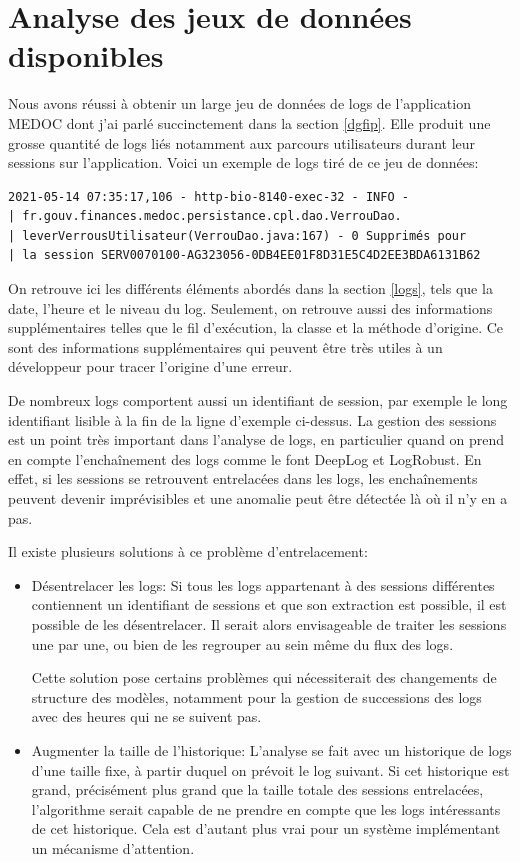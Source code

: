 \documentclass[openany, 11pt]{memoir}
\begin{document}
\newpage
\section{Analyse des jeux de données disponibles}

Nous avons réussi à obtenir un large jeu de données de \glspl{log} de l'application \gls{MEDOC} dont j'ai parlé succinctement dans la section \ref{dgfip}. Elle produit une grosse quantité de logs liés notamment aux parcours utilisateurs durant leur sessions sur l'application. Voici un exemple de logs tiré de ce jeu de données:

\begin{lstlisting}
2021-05-14 07:35:17,106 - http-bio-8140-exec-32 - INFO -
| fr.gouv.finances.medoc.persistance.cpl.dao.VerrouDao.
| leverVerrousUtilisateur(VerrouDao.java:167) - 0 Supprimés pour
| la session SERV0070100-AG323056-0DB4EE01F8D31E5C4D2EE3BDA6131B62
\end{lstlisting}

On retrouve ici les différents éléments abordés dans la section \ref{logs}, tels que la date, l'heure et le niveau du \gls{log}. Seulement, on retrouve aussi des informations supplémentaires telles que le fil d'exécution, la classe et la méthode d'origine. Ce sont des informations supplémentaires qui peuvent être très utiles à un développeur pour tracer l'origine d'une erreur.

\bigskip
De nombreux \glspl{log} comportent aussi un identifiant de session, par exemple le long identifiant lisible à la fin de la ligne d'exemple ci-dessus. La gestion des sessions est un point très important dans l'analyse de logs, en particulier quand on prend en compte l'enchaînement des logs comme le font DeepLog et LogRobust. En effet, si les sessions se retrouvent entrelacées dans les logs, les enchaînements peuvent devenir imprévisibles et une anomalie peut être détectée là où il n'y en a pas.

Il existe plusieurs solutions à ce problème d'entrelacement:
\begin{itemize}
	\item Désentrelacer les \glspl{log}: Si tous les logs appartenant à des sessions différentes contiennent un identifiant de sessions et que son extraction est possible, il est possible de les désentrelacer. Il serait alors envisageable de traiter les sessions une par une, ou bien de les regrouper au sein même du flux des logs.

Cette solution pose certains problèmes qui nécessiterait des changements de structure des modèles, notamment pour la gestion de successions des \glspl{log} avec des heures qui ne se suivent pas.

	\item Augmenter la taille de l'historique: L'analyse se fait avec un historique de \glspl{log} d'une taille fixe, à partir duquel on prévoit le log suivant. Si cet historique est grand, précisément plus grand que la taille totale des sessions entrelacées, l'algorithme serait capable de ne prendre en compte que les logs intéressants de cet historique. Cela est d'autant plus vrai pour un système implémentant un mécanisme d'attention.
\end{itemize}
\end{document}
